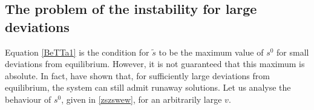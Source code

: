 \documentclass[a4paper, amsfonts, amssymb, amsmath, reprint, showkeys, nofootinbib, twoside]{revtex4-1}
\begin{document}
\subsection{The problem of the instability for large deviations}



Equation \eqref{BeTTa1} is the condition for $\tilde{s}$ to be the maximum value of $s^0$ for small deviations from equilibrium. However, it is not guaranteed that this maximum is absolute. In fact, \citet{Hishcock1988} have shown that, for sufficiently large deviations from equilibrium, the system can still admit runaway solutions. 
Let us analyse the behaviour of $s^0$, given in \eqref{zszswew}, for an arbitrarily large $v$.
\end{document}
